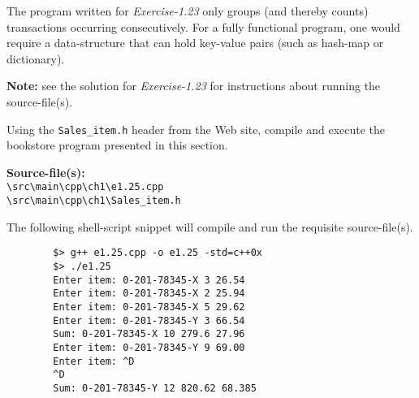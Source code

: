 \documentclass[12pt, a4paper]{article}
\begin{document}
    \noindent The program written for \textit{Exercise-1.23} only groups (and thereby counts) transactions occurring consecutively.
    For a fully functional program, one would require a data-structure that can hold key-value pairs (such as hash-map or dictionary).

    \noindent\textbf{Note:} see the solution for \textit{Exercise-1.23} for instructions about running the source-file(s).

    \bigskip
    \begin{tcolorbox}[title={Exercise: 1.25}]
        Using the \texttt{Sales\_item.h} header from the Web site, compile and execute the bookstore program presented in this section.
    \end{tcolorbox}
    \noindent\textbf{Source-file(s):}
    \\ \texttt{\textbackslash src\textbackslash main\textbackslash cpp\textbackslash ch1\textbackslash e1.25.cpp}
    \\ \texttt{\textbackslash src\textbackslash main\textbackslash cpp\textbackslash ch1\textbackslash Sales\_item.h}

    \noindent The following shell-script snippet will compile and run the requisite source-file(s).
    \begin{verbatim}
        $> g++ e1.25.cpp -o e1.25 -std=c++0x
        $> ./e1.25
        Enter item: 0-201-78345-X 3 26.54
        Enter item: 0-201-78345-X 2 25.94
        Enter item: 0-201-78345-X 5 29.62
        Enter item: 0-201-78345-Y 3 66.54
        Sum: 0-201-78345-X 10 279.6 27.96
        Enter item: 0-201-78345-Y 9 69.00
        Enter item: ^D
        ^D
        Sum: 0-201-78345-Y 12 820.62 68.385
    \end{verbatim}

    \pagebreak
    \printbibliography
\end{document}
